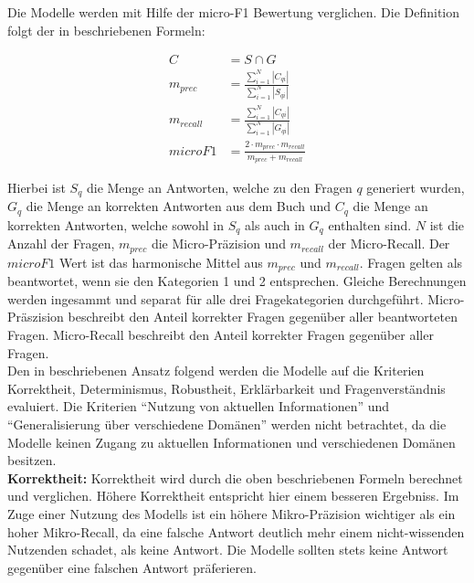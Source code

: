Die Modelle werden mit Hilfe der micro-F1 Bewertung verglichen.
Die Definition folgt der in \citet{chatgpt_qas} beschriebenen Formeln:
\begin{ceqn}
\begin{align}
    C &= S \cap G \\
    m_{prec} &= \frac{\sum_{i=1}^{N}|C_{qi}|}{\sum_{i=1}^{N}|S_{qi}|} \\
    m_{recall} &= \frac{\sum_{i=1}^{N}|C_{qi}|}{\sum_{i=1}^{N}|G_{qi}|} \\
    microF1 &= \frac{2 \cdot m_{prec} \cdot m_{recall}}{m_{prec} + m_{recall}}
\end{align}
\end{ceqn}
Hierbei ist $S_q$ die Menge an Antworten, welche zu den Fragen $q$ generiert wurden, $G_q$ die Menge an korrekten Antworten aus dem Buch \citet{bb} und $C_q$ die Menge an korrekten Antworten, welche sowohl in $S_q$ als auch in $G_q$ enthalten sind.
$N$ ist die Anzahl der Fragen, $m_{prec}$ die Micro-Präzision und $m_{recall}$ der Micro-Recall.
Der $microF1$ Wert ist das harmonische Mittel aus $m_{prec}$ und $m_{recall}$.
Fragen gelten als beantwortet, wenn sie den Kategorien 1 und 2 entsprechen.
Gleiche Berechnungen werden ingesammt und separat für alle drei Fragekategorien durchgeführt.
Micro-Präszision beschreibt den Anteil korrekter Fragen gegenüber aller beantworteten Fragen.
Micro-Recall beschreibt den Anteil korrekter Fragen gegenüber aller Fragen.\\

Den in \citet{chatgpt_qas} beschriebenen Ansatz folgend werden die Modelle auf die Kriterien Korrektheit, Determinismus, Robustheit, Erklärbarkeit und Fragenverständnis evaluiert.
Die Kriterien \enquote{Nutzung von aktuellen Informationen} und \enquote{Generalisierung über verschiedene Domänen} werden nicht betrachtet, da die Modelle keinen Zugang zu aktuellen Informationen und verschiedenen Domänen besitzen.\\

\noindent\textbf{Korrektheit:}\newline
Korrektheit wird durch die oben beschriebenen Formeln berechnet und verglichen.
Höhere Korrektheit entspricht hier einem besseren Ergebniss.
Im Zuge einer Nutzung des Modells ist ein höhere Mikro-Präzision wichtiger als ein hoher Mikro-Recall, da eine falsche Antwort deutlich mehr einem nicht-wissenden Nutzenden schadet, als keine Antwort.
Die Modelle sollten stets keine Antwort gegenüber eine falschen Antwort präferieren.\\

